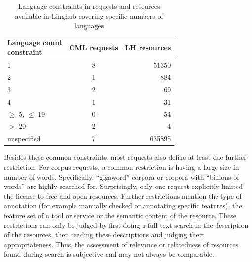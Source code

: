 \documentclass[smallextended]{svjour3}       %
\begin{document}
\begin{table}
  \centering
    \begin{tabular}{lcr}
    \toprule
    \bfseries \shortstack{Language count\\constraint} & \bfseries CML requests & \bfseries LH resources \\
    \midrule
    1                         & 8            & 51350 \\
    2                         & 1            & 884 \\
    3                         & 2            & 69 \\
    4                         & 1            & 31 \\
    $\geq$ 5, $\leq$ 19       & 0            & 54 \\  
    $>$ 20                    & 2            & 4 \\
    unspecified               & 7            & 635895 \\
    \bottomrule
\end{tabular}
    \caption{\label{tab:language-constraints}  Language constraints in requests
        and resources available in Linghub covering specific numbers of
    languages}
\end{table}

%

Besides these common constraints, most requests also define at least one further
restriction. For corpus requests, a common restriction is having a large size in
number of words. Specifically, “gigaword” corpora or corpora with “billions of
words” are highly searched for. Surprisingly, only one request explicitly
limited the license to free and open resources. Further restrictions mention the
type of annotation (for example manually checked or annotating specific
features), the feature set of a tool or service or the semantic content of the
resource. These restrictions can only be judged by first doing a full-text
search in the description of the resources, then reading these descriptions and
judging their appropriateness. Thus, the assessment of relevance or relatedness
of resources found during search is subjective and may not always be comparable.
\end{document}
